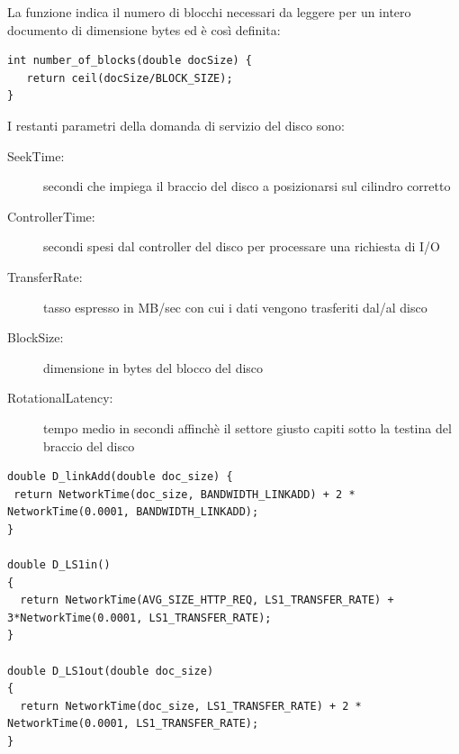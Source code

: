La funzione  indica il numero di blocchi necessari da leggere per un intero documento di dimensione  bytes ed è così definita:
\begin{lstlisting}
int number_of_blocks(double docSize) { 
   return ceil(docSize/BLOCK_SIZE); 
}
\end{lstlisting}
I restanti parametri della domanda di servizio del disco sono:
\begin{description}
	\item[SeekTime:] secondi che impiega il braccio del disco a posizionarsi sul cilindro corretto 
	\item[ControllerTime:] secondi spesi dal controller del disco per processare una richiesta di I/O 
	\item[TransferRate:] tasso espresso in MB/sec con cui i dati vengono trasferiti dal/al disco 
	\item[BlockSize:] dimensione in bytes del blocco del disco 
	\item[RotationalLatency:] tempo medio in secondi affinchè il settore giusto capiti sotto la testina del braccio del disco 
\end{description}
\begin{lstlisting}
double D_linkAdd(double doc_size) { 
 return NetworkTime(doc_size, BANDWIDTH_LINKADD) + 2 * NetworkTime(0.0001, BANDWIDTH_LINKADD); 
} 

double D_LS1in() 
{ 
  return NetworkTime(AVG_SIZE_HTTP_REQ, LS1_TRANSFER_RATE) + 3*NetworkTime(0.0001, LS1_TRANSFER_RATE); 
} 

double D_LS1out(double doc_size) 
{ 
  return NetworkTime(doc_size, LS1_TRANSFER_RATE) + 2 * NetworkTime(0.0001, LS1_TRANSFER_RATE); 
}
\end{lstlisting}

